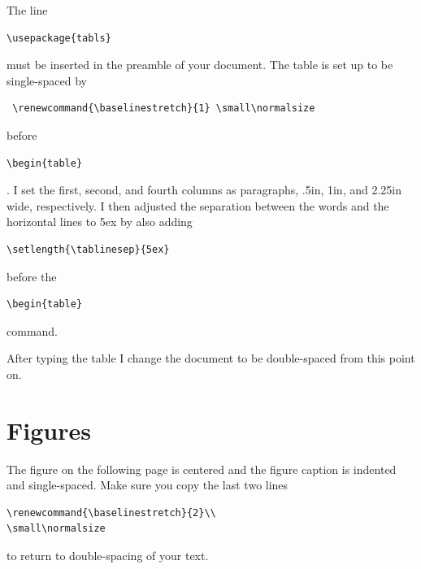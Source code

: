 \renewcommand{\baselinestretch}{2}
\small\normalsize

The line \begin{verbatim}\usepackage{tabls}\end{verbatim} must be inserted in the preamble of your document.
The table is set up to be single-spaced by \begin{verbatim} \renewcommand{\baselinestretch}{1} \small\normalsize\end{verbatim} before \begin{verbatim}\begin{table}\end{verbatim}.  I set the first, second, and fourth columns as paragraphs, .5in, 1in, and 2.25in wide, respectively.  I then adjusted the separation between the words and the horizontal lines to 5ex by also adding \begin{verbatim}\setlength{\tablinesep}{5ex}\end{verbatim} before the \begin{verbatim}\begin{table}\end{verbatim} command.

After typing the table I change the document to be double-spaced from this point on.

\newpage


\section{Figures}

The figure on the following page is centered and the figure
caption is indented and single-spaced.  Make sure you copy the
last two lines \begin{verbatim}
\renewcommand{\baselinestretch}{2}\\
\small\normalsize\end{verbatim} to return to double-spacing of your text.

